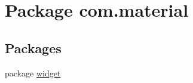 \hypertarget{namespacecom_1_1material}{}\section{Package com.\+material}
\label{namespacecom_1_1material}
\subsection*{Packages}
\begin{DoxyCompactItemize}
\item 
package \hyperlink{namespacecom_1_1material_1_1widget}{widget}
\end{DoxyCompactItemize}
